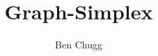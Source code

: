 \documentclass[11pt, oneside]{book}
\title{Graph-Simplex}
\author{Ben Chugg}
\date{}
\begin{document}
\frontmatterstyling
\tableofcontents
%

\midmatterstyling






\backmatterstyling


\end{document}
